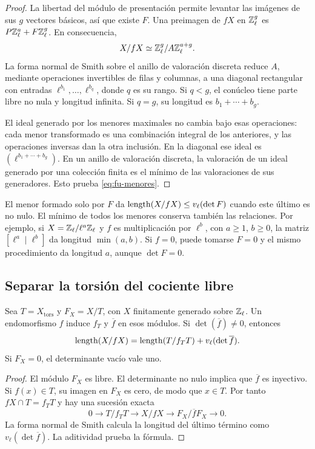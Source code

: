 \begin{proof}
La libertad del módulo de presentación permite levantar las
imágenes de sus $g$ vectores básicos, así que existe $F$.
Una preimagen de $fX$ en $\mathbb{Z}_\ell^g$ es
$P\mathbb{Z}_\ell^a+F\mathbb{Z}_\ell^g$. En consecuencia,
\[
 X/fX\simeq\mathbb{Z}_\ell^g/A\mathbb{Z}_\ell^{a+g}.
\]
La forma normal de Smith sobre el anillo de valoración discreta
reduce $A$, mediante operaciones invertibles de filas y columnas,
a una diagonal rectangular con entradas
$\ell^{b_1},\ldots,\ell^{b_q}$, donde $q$ es su rango.
Si $q<g$, el conúcleo tiene parte libre no nula y longitud infinita.
Si $q=g$, su longitud es $b_1+\cdots+b_g$.

El ideal generado por los menores maximales no cambia bajo esas
operaciones: cada menor transformado es una combinación integral
de los anteriores, y las operaciones inversas dan la otra inclusión.
En la diagonal ese ideal es
$(\ell^{b_1+\cdots+b_g})$. En un anillo de valoración discreta,
la valoración de un ideal generado por una colección finita
es el mínimo de las valoraciones de sus generadores.
Esto prueba \eqref{eq:fu-menores}.
\end{proof}

El menor formado solo por $F$ da
$\operatorname{length}(X/fX)\le v_\ell(\det F)$ cuando este último es no nulo.
El mínimo de todos los menores conserva también las relaciones.
Por ejemplo, si $X=\mathbb{Z}_\ell/\ell^a\mathbb{Z}_\ell$ y $f$ es
multiplicación por $\ell^b$, con $a\ge1$, $b\ge0$, la matriz
$[\ell^a\mid\ell^b]$ da longitud $\min(a,b)$.
Si $f=0$, puede tomarse $F=0$ y el mismo procedimiento da
longitud $a$, aunque $\det F=0$.

\subsection{Separar la torsión del cociente libre}

\begin{proposicion}
\label{prop:fu-torsion}
Sea $T=X_{\mathrm{tors}}$ y $F_X=X/T$, con $X$ finitamente
generado sobre $\mathbb{Z}_\ell$. Un endomorfismo $f$ induce
$f_T$ y $\overline f$ en esos módulos. Si
$\det(\overline f)\ne0$, entonces
\begin{equation}
 \operatorname{length}(X/fX)
 =\operatorname{length}(T/f_TT)+v_\ell(\det\overline f).
 \label{eq:fu-torsion-libre}
\end{equation}
Si $F_X=0$, el determinante vacío vale uno.
\end{proposicion}

\begin{proof}
El módulo $F_X$ es libre. El determinante no nulo implica que
$\overline f$ es inyectivo. Si $f(x)\in T$, su imagen en $F_X$
es cero, de modo que $x\in T$. Por tanto
$fX\cap T=f_TT$ y hay una sucesión exacta
\[
 0\longrightarrow T/f_TT\longrightarrow X/fX
 \longrightarrow F_X/\overline f F_X\longrightarrow0.
\]
La forma normal de Smith calcula la longitud del último término
como $v_\ell(\det\overline f)$. La aditividad prueba la fórmula.
\end{proof}

